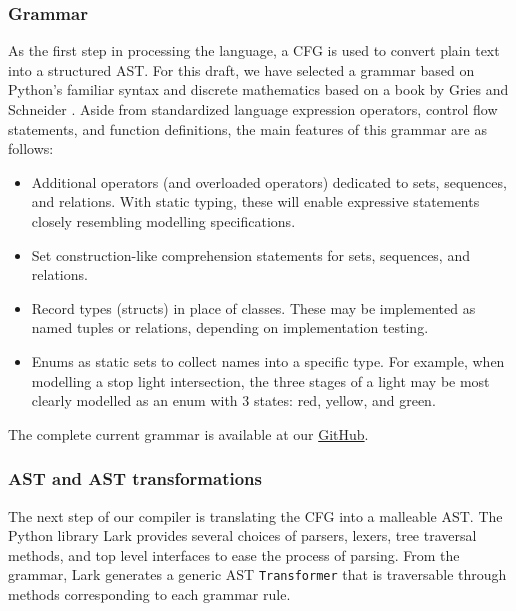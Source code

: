 \documentclass{article}
\begin{document}
\subsubsection{Grammar}

As the first step in processing the language, a CFG is used to convert plain text into a structured AST. For this draft, we have selected a grammar based on Python's familiar syntax \cite{pythonGrammar} and discrete mathematics based on a book by Gries and Schneider \cite{griesAndSchneider}. Aside from standardized language expression operators, control flow statements, and function definitions, the main features of this grammar are as follows:
\begin{itemize}
  \item Additional operators (and overloaded operators) dedicated to sets, sequences, and relations. With static typing, these will enable expressive statements closely resembling modelling specifications.
  \item Set construction-like comprehension statements for sets, sequences, and relations.
  \item Record types (structs) in place of classes. These may be implemented as named tuples or relations, depending on implementation testing.
  \item Enums as static sets to collect names into a specific type. For example, when modelling a stop light intersection, the three stages of a light may be most clearly modelled as an enum with 3 states: red, yellow, and green.
\end{itemize}

The complete current grammar is available at our \href{https://github.com/Ant13731/compilers/blob/main/implementation/grammar.lark}{GitHub}.

\subsubsection{AST and AST transformations}

The next step of our compiler is translating the CFG into a malleable AST. The Python library Lark \cite{lark} provides several choices of parsers, lexers, tree traversal methods, and top level interfaces to ease the process of parsing. From the grammar, Lark generates a generic AST \texttt{Transformer} that is traversable through methods corresponding to each grammar rule.
\end{document}
